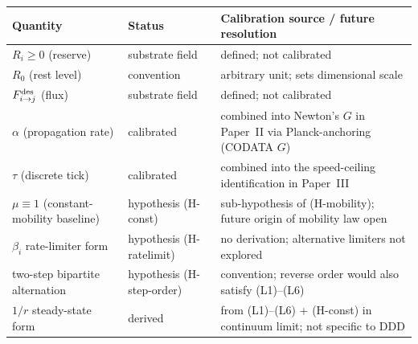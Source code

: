 \documentclass[11pt,a4paper]{article}
\begin{document}
\begin{center}
\begin{tabular}{p{3.6cm}p{2.8cm}p{6.8cm}}
\toprule
Quantity & Status & Calibration source / future resolution \\
\midrule
$R_i \ge 0$ (reserve) & substrate field & defined; not calibrated \\
$R_0$ (rest level) & convention & arbitrary unit; sets dimensional scale \\
$F_{i\to j}^{\rm des}$ (flux) & substrate field & defined; not calibrated \\
$\alpha$ (propagation rate) & calibrated & combined into Newton's $G$ in Paper~II via Planck-anchoring (CODATA $G$) \\
$\tau$ (discrete tick) & calibrated & combined into the speed-ceiling identification in Paper~III \\
$\mu \equiv 1$ (constant-mobility baseline) & hypothesis (H-const) & sub-hypothesis of (H-mobility); future origin of mobility law open \\
$\beta_i$ rate-limiter form & hypothesis (H-ratelimit) & no derivation; alternative limiters not explored \\
two-step bipartite alternation & hypothesis (H-step-order) & convention; reverse order would also satisfy (L1)--(L6) \\
$1/r$ steady-state form & derived & from (L1)--(L6) + (H-const) in continuum limit; not specific to DDD \\
\bottomrule
\end{tabular}
\end{center}
\end{document}
